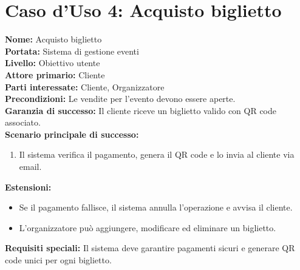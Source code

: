 \documentclass[a4paper,12pt]{article}
\begin{document}
{\section*{\textcolor{sectioncolor}{Caso d'Uso 4: Acquisto biglietto}}
\textcolor{textcolor}{
\textbf{Nome:} Acquisto biglietto\\
\textbf{Portata:} Sistema di gestione eventi\\
\textbf{Livello:} Obiettivo utente\\
\textbf{Attore primario:} Cliente\\
\textbf{Parti interessate:} Cliente, Organizzatore\\
\textbf{Precondizioni:} Le vendite per l'evento devono essere aperte.\\
\textbf{Garanzia di successo:} Il cliente riceve un biglietto valido con QR code associato.\\
\textbf{Scenario principale di successo:}
\begin{enumerate}
    \item Il sistema verifica il pagamento, genera il QR code e lo invia al cliente via email.
\end{enumerate}
\textbf{Estensioni:}
\begin{itemize}
    \item  Se il pagamento fallisce, il sistema annulla l'operazione e avvisa il cliente.
    \item  L'organizzatore può aggiungere, modificare ed eliminare un biglietto.
\end{itemize}
\textbf{Requisiti speciali:} Il sistema deve garantire pagamenti sicuri e generare QR code unici per ogni biglietto.
}

}
\end{document}
